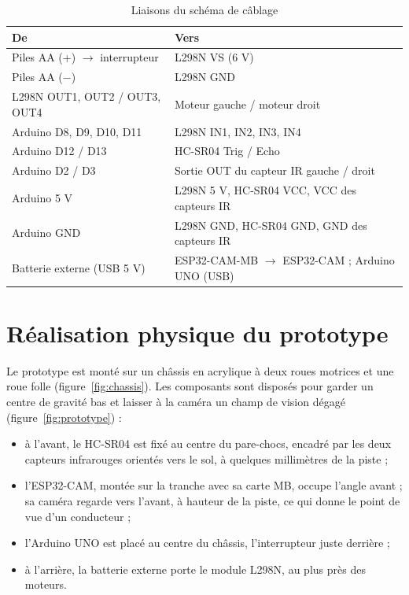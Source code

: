 \begin{table}[H]
\centering\small
\caption{Liaisons du schéma de câblage}
\label{tab:liaisons}
\begin{tabular}{ll}
\toprule
\textbf{De} & \textbf{Vers} \\
\midrule
Piles AA (+) $\rightarrow$ interrupteur & L298N VS (6 V) \\
Piles AA ($-$) & L298N GND \\
L298N OUT1, OUT2 / OUT3, OUT4 & Moteur gauche / moteur droit \\
Arduino D8, D9, D10, D11 & L298N IN1, IN2, IN3, IN4 \\
Arduino D12 / D13 & HC-SR04 Trig / Echo \\
Arduino D2 / D3 & Sortie OUT du capteur IR gauche / droit \\
Arduino 5 V & L298N 5 V, HC-SR04 VCC, VCC des capteurs IR \\
Arduino GND & L298N GND, HC-SR04 GND, GND des capteurs IR \\
Batterie externe (USB 5 V) & ESP32-CAM-MB $\rightarrow$ ESP32-CAM ; Arduino UNO (USB) \\
\bottomrule
\end{tabular}
\end{table}

\section{Réalisation physique du prototype}

Le prototype est monté sur un châssis en acrylique à deux roues motrices et une roue folle
(figure~\ref{fig:chassis}). Les composants sont disposés pour garder un centre de gravité bas et laisser à la
caméra un champ de vision dégagé (figure~\ref{fig:prototype}) :
\begin{itemize}
  \item à l'avant, le HC-SR04 est fixé au centre du pare-chocs, encadré par les deux capteurs infrarouges orientés
        vers le sol, à quelques millimètres de la piste ;
  \item l'ESP32-CAM, montée sur la tranche avec sa carte MB, occupe l'angle avant ; sa caméra regarde vers
        l'avant, à hauteur de la piste, ce qui donne le point de vue d'un conducteur ;
  \item l'Arduino UNO est placé au centre du châssis, l'interrupteur juste derrière ;
  \item à l'arrière, la batterie externe porte le module L298N, au plus près des moteurs.
\end{itemize}

